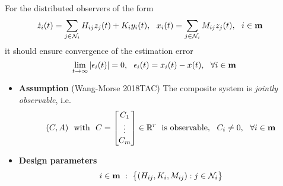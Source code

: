 \documentclass{beamer}
\newcommand{\R}{\mathbb{R}}
\begin{document}
\begin{frame}{\color{blue} }

For the distributed observers of the form
\begin{align*}
\dot{z}_{i}(t)&=\sum_{j\in\mathcal{N}_{i}} H_{ij}z_{j}(t) + K_{i}y_{i}(t),~~ x_{i}(t)=\sum_{j\in\mathcal{N}_{i}} M_{ij}z_{j}(t),~~ i\in{\bf m}
\end{align*}
it should ensure convergence of the estimation error
\begin{equation*}
\lim_{t\rightarrow\infty} |\epsilon_{i}(t)|=0,~~ \epsilon_{i}(t)=x_{i}(t)-x(t),~~ \forall i\in{\bf m}
\end{equation*}


\begin{itemize}
  \item \textbf{Assumption} (Wang-Morse 2018TAC) The composite system is \emph{jointly observable}, i.e.
\begin{equation*}
(C,A) ~~\text{with}~~ C=\begin{bmatrix} C_{1} \\ \vdots \\ C_{m} \\   \end{bmatrix}\in\R^{r} ~~\text{is observable},~~ C_{i}\neq0,~~ \forall i\in{\bf m}
\end{equation*}


  \item \textbf{Design parameters}
\begin{equation*}
i\in{\bf m} ~:~ \big\{(H_{ij}, K_{i}, M_{ij}) : j\in\mathcal{N}_{i}\big\}
\end{equation*}
\end{itemize}
\end{frame}
\end{document}
